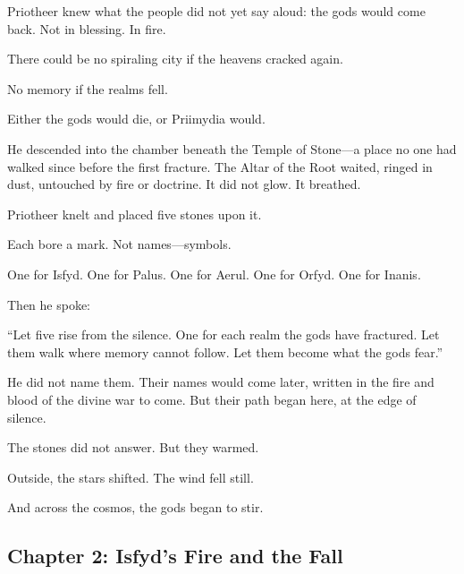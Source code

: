 \documentclass[9pt]{article}
\begin{document}
Priotheer knew what the people did not yet say aloud: the gods would come back. Not in blessing. In fire.

There could be no spiraling city if the heavens cracked again. 

No memory if the realms fell. 

Either the gods would die, or Priimydia would.

He descended into the chamber beneath the Temple of Stone—a place no one had walked since before the first fracture. The Altar of the Root waited, ringed in dust, untouched by fire or doctrine. It did not glow. It breathed.

Priotheer knelt and placed five stones upon it.

Each bore a mark. Not names—symbols.

One for Isfyd. One for Palus. One for Aerul. One for Orfyd. One for Inanis.

Then he spoke:

“Let five rise from the silence. One for each realm the gods have fractured.  
Let them walk where memory cannot follow.  
Let them become what the gods fear.”

He did not name them. Their names would come later, written in the fire and blood of the divine war to come. But their path began here, at the edge of silence.

The stones did not answer. But they warmed.

Outside, the stars shifted. The wind fell still.

And across the cosmos, the gods began to stir.

\newpage

\subsection*{Chapter 2: Isfyd's Fire and the Fall}

\vspace{1in}
\end{document}
